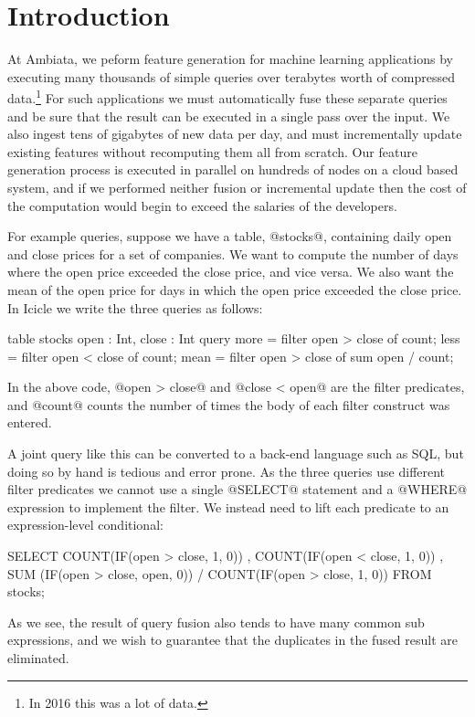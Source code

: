 \section{Introduction}
\label{s:Introduction}

At Ambiata, we peform feature generation for machine learning applications by executing many thousands of simple queries over terabytes worth of compressed data.\footnote{In 2016 this was a lot of data.}
For such applications we must automatically fuse these separate queries and be sure that the result can be executed in a single pass over the input.
We also ingest tens of gigabytes of new data per day, and must incrementally update existing features without recomputing them all from scratch.
Our feature generation process is executed in parallel on hundreds of nodes on a cloud based system, and if we performed neither fusion or incremental update then the cost of the computation would begin to exceed the salaries of the developers.

For example queries, suppose we have a table, @stocks@, containing daily open and close prices for a set of companies. We want to compute the number of days where the open price exceeded the close price, and vice versa. We also want the mean of the open price for days in which the open price exceeded the close price. In Icicle we write the three queries as follows:

\begin{code}
table stocks { open : Int, close : Int }
query 
  more  = filter open > close of count;
  less  = filter open < close of count;
  mean  = filter open > close of sum open / count;
\end{code}
In the above code, @open > close@ and @close < open@ are the filter predicates, and @count@ counts the number of times the body of each filter construct was entered.

A joint query like this can be converted to a back-end language such as SQL, but doing so by hand is tedious and error prone. As the three queries use different filter predicates we cannot use a single @SELECT@ statement and a @WHERE@ expression to implement the filter. We instead need to lift each predicate to an expression-level conditional:
\begin{code}
  SELECT COUNT(IF(open > close, 1, 0))
       , COUNT(IF(open < close, 1, 0))
       , SUM  (IF(open > close, open, 0))
       / COUNT(IF(open > close, 1, 0))
  FROM stocks;
\end{code}
As we see, the result of query fusion also tends to have many common sub expressions, and we wish to guarantee that the duplicates in the fused result are eliminated.

